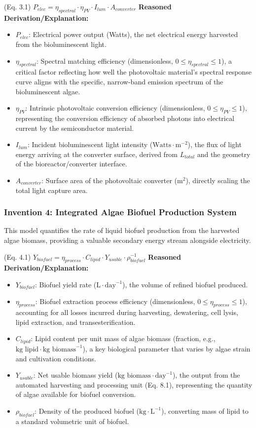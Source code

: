 \documentclass{article}
\newenvironment{reasonedderivation}{
    \textbf{Reasoned Derivation/Explanation:}
    \begin{itemize}
}{
    \end{itemize}
}
\begin{document}
(Eq. 3.1) $P_{elec} = \eta_{spectral} \cdot \eta_{PV} \cdot I_{lum} \cdot A_{converter}$
\begin{reasonedderivation}
    \item $P_{elec}$: Electrical power output (Watts), the net electrical energy harvested from the bioluminescent light.
    \item $\eta_{spectral}$: Spectral matching efficiency (dimensionless, $0 \le \eta_{spectral} \le 1$), a critical factor reflecting how well the photovoltaic material's spectral response curve aligns with the specific, narrow-band emission spectrum of the bioluminescent algae.
    \item $\eta_{PV}$: Intrinsic photovoltaic conversion efficiency (dimensionless, $0 \le \eta_{PV} \le 1$), representing the conversion efficiency of absorbed photons into electrical current by the semiconductor material.
    \item $I_{lum}$: Incident bioluminescent light intensity ($\text{Watts} \cdot \text{m}^{-2}$), the flux of light energy arriving at the converter surface, derived from $L_{total}$ and the geometry of the bioreactor/converter interface.
    \item $A_{converter}$: Surface area of the photovoltaic converter ($\text{m}^2$), directly scaling the total light capture area.
\end{reasonedderivation}

\subsubsection*{Invention 4: Integrated Algae Biofuel Production System}
This model quantifies the rate of liquid biofuel production from the harvested algae biomass, providing a valuable secondary energy stream alongside electricity.

(Eq. 4.1) $Y_{biofuel} = \eta_{process} \cdot C_{lipid} \cdot Y_{usable} \cdot \rho_{biofuel}^{-1}$
\begin{reasonedderivation}
    \item $Y_{biofuel}$: Biofuel yield rate ($\text{L} \cdot \text{day}^{-1}$), the volume of refined biofuel produced.
    \item $\eta_{process}$: Biofuel extraction process efficiency (dimensionless, $0 \le \eta_{process} \le 1$), accounting for all losses incurred during harvesting, dewatering, cell lysis, lipid extraction, and transesterification.
    \item $C_{lipid}$: Lipid content per unit mass of algae biomass (fraction, e.g., $\text{kg lipid} \cdot \text{kg biomass}^{-1}$), a key biological parameter that varies by algae strain and cultivation conditions.
    \item $Y_{usable}$: Net usable biomass yield ($\text{kg biomass} \cdot \text{day}^{-1}$), the output from the automated harvesting and processing unit (Eq. 8.1), representing the quantity of algae available for biofuel conversion.
    \item $\rho_{biofuel}$: Density of the produced biofuel ($\text{kg} \cdot \text{L}^{-1}$), converting mass of lipid to a standard volumetric unit of biofuel.
\end{reasonedderivation}
\end{document}
